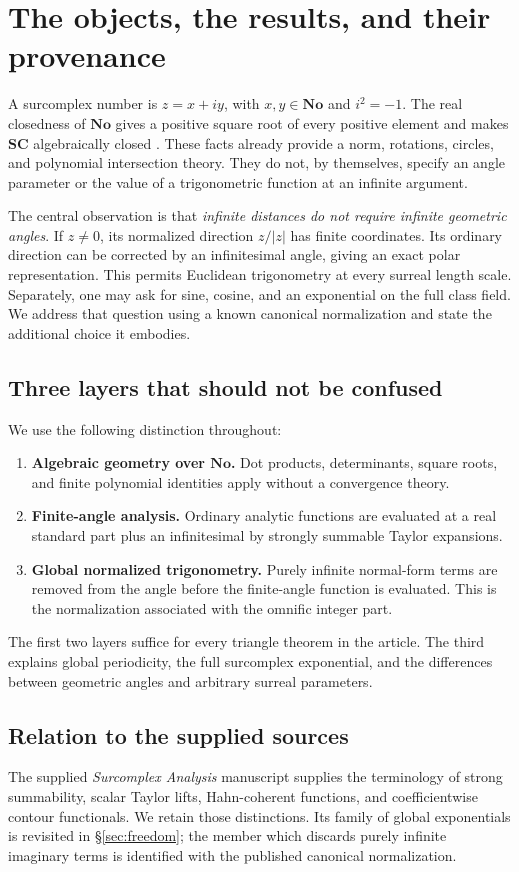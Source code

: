 \documentclass[11pt,letterpaper]{article}
\theoremstyle{definition}
\theoremstyle{remark}
\newcommand{\No}{\mathbf{No}}
\newcommand{\SC}{\mathbf{SC}}
\numberwithin{equation}{section}
\begin{document}
\section{The objects, the results, and their provenance}\label{sec:intro}
A surcomplex number is $z=x+iy$, with $x,y\in\No$ and $i^2=-1$. The real closedness of $\No$ gives a positive square root of every positive element and makes $\SC$ algebraically closed \cite{Conway,Gonshor}. These facts already provide a norm, rotations, circles, and polynomial intersection theory. They do not, by themselves, specify an angle parameter or the value of a trigonometric function at an infinite argument.

The central observation is that \emph{infinite distances do not require infinite geometric angles}. If $z\ne0$, its normalized direction $z/|z|$ has finite coordinates. Its ordinary direction can be corrected by an infinitesimal angle, giving an exact polar representation. This permits Euclidean trigonometry at every surreal length scale. Separately, one may ask for sine, cosine, and an exponential on the full class field. We address that question using a known canonical normalization and state the additional choice it embodies.

\subsection{Three layers that should not be confused}
We use the following distinction throughout:
\begin{enumerate}
\item \textbf{Algebraic geometry over $\No$.} Dot products, determinants, square roots, and finite polynomial identities apply without a convergence theory.
\item \textbf{Finite-angle analysis.} Ordinary analytic functions are evaluated at a real standard part plus an infinitesimal by strongly summable Taylor expansions.
\item \textbf{Global normalized trigonometry.} Purely infinite normal-form terms are removed from the angle before the finite-angle function is evaluated. This is the normalization associated with the omnific integer part.
\end{enumerate}
The first two layers suffice for every triangle theorem in the article. The third explains global periodicity, the full surcomplex exponential, and the differences between geometric angles and arbitrary surreal parameters.

\subsection{Relation to the supplied sources}\label{sec:provenance}
The supplied \emph{Surcomplex Analysis} manuscript \cite{InputAnalysis} supplies the terminology of strong summability, scalar Taylor lifts, Hahn-coherent functions, and coefficientwise contour functionals. We retain those distinctions. Its family of global exponentials is revisited in \S\ref{sec:freedom}; the member which discards purely infinite imaginary terms is identified with the published canonical normalization.
\end{document}
